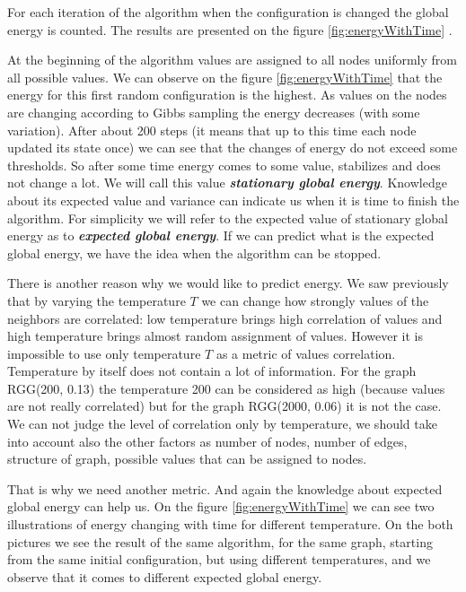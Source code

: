 \documentclass[12pt]{report}
\begin{document}
For each iteration of the algorithm when the configuration is changed the global energy is counted. The results are presented on the figure \ref{fig:energyWithTime} .


At the beginning of the algorithm values are assigned to all nodes uniformly from all possible values. We can observe on the figure \ref{fig:energyWithTime} that the energy for this first random configuration is the highest. As values on the nodes are changing according to Gibbs sampling the energy decreases (with some variation). After about 200 steps (it means that up to this time each node updated its state once) we can see that the changes of energy do not exceed some thresholds. So after some time energy comes to some value, stabilizes and does not change a lot. We will call this value \textbf{\textit{stationary global energy}}. Knowledge about its expected value and variance can indicate us when it is time to finish the algorithm. For simplicity we will refer to the expected value of stationary global energy as to \textbf{\textit{expected global energy}}. If we can predict what is the expected global energy, we have the idea when the algorithm can be stopped. 
 
There is another reason why we would like to predict energy.
We saw previously that by varying the temperature $T$ we can change how strongly values of the neighbors are correlated: low temperature brings high correlation of values and high temperature brings almost random assignment of values. However it is impossible to use only temperature $T$ as a metric of values correlation. Temperature by itself does not contain a lot of information. For the graph RGG(200, 0.13) the temperature 200 can be considered as high (because values are not really correlated) but for the graph RGG(2000, 0.06) it is not the case. We can not judge the level of correlation only by temperature, we should take into account also the other factors as number of nodes, number of edges, structure of graph, possible values that can be assigned to nodes. 


That is why we need another metric. And again the knowledge about expected global energy can help us. On the figure \ref{fig:energyWithTime} we can see two illustrations of energy changing with time for different temperature. On the both pictures we see the result of the same algorithm, for the same graph, starting from the same initial configuration, but using different temperatures, and we observe that it comes to different expected global energy.
\end{document}
